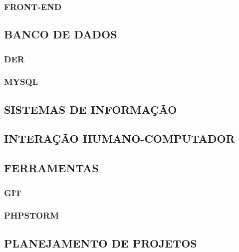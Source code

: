 \documentclass[
  12pt,				%
  openany,
  oneside,
  a4paper,			%
  english,			%
  brazil
]{article}
\numberwithin{figure}{section}
\numberwithin{table}{section}
\newcounter{subsubsubsection}[subsubsection]
\begin{document}
\subsubsection{FRONT-END}





\subsection{BANCO DE DADOS}
\subsubsection{DER}
\subsubsection{MYSQL}

\subsection{SISTEMAS DE INFORMAÇÃO}

\subsection{INTERAÇÃO HUMANO-COMPUTADOR}

\subsection{FERRAMENTAS}
\subsubsection{GIT}
\subsubsection{PHPSTORM}




\subsection{PLANEJAMENTO DE PROJETOS}
\end{document}
